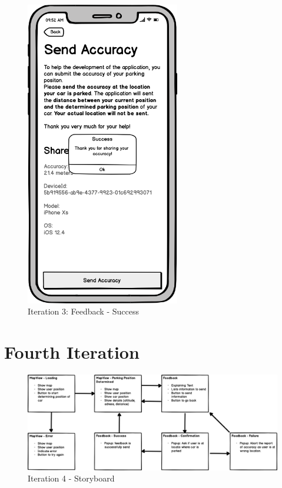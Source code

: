 \begin{figure}[H]
  \centering
  \begin{minipage}[b]{0.45\textwidth}
    \centering
    \includegraphics[width=0.6\textwidth]{images/UI/Iteration3-Feedback-Success.png}
    \caption{Iteration 3: Feedback - Success}
    \label{fig:i3-feedback-succ}
  \end{minipage}
  \hfill
  \begin{minipage}[b]{0.45\textwidth}
    
  \end{minipage}
\end{figure}

\section{Fourth Iteration}

\begin{figure}[H]
    \centering
    \includegraphics[width=\textwidth]{images/UI/Iteration4-Overview.png}
    \caption{Iteration 4 - Storyboard}
    \label{fig:i4story}
\end{figure}

